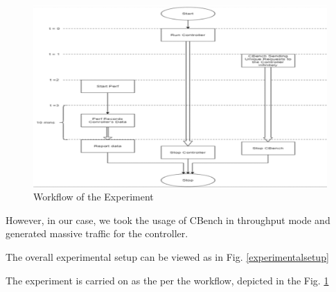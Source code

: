\begin{figure}[!hbt]
    \centering
        \includegraphics[width=\textwidth,keepaspectratio]{images/Workflow.PNG}
       \caption{Workflow of the Experiment}
        \label{workflowexperiment}
\end{figure}

However, in our case, we took the usage of CBench in throughput mode and generated massive traffic for the controller.

The overall experimental setup can be viewed as in Fig. \ref{experimentalsetup}

The experiment is carried on as the per the workflow, depicted in the Fig. \ref{workflowexperiment}
